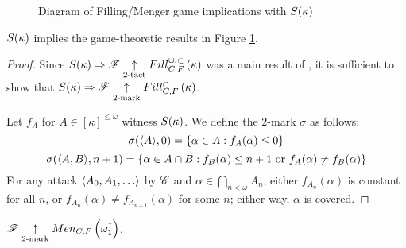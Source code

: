 \begin{figure}[h]
\begin{center}
\end{center}
\caption{Diagram of Filling/Menger game implications with $S(\kappa)$}
\label{fillingGamesDiagram2}
\end{figure}

\begin{thm}
  $S(\kappa)$ implies the game-theoretic results in
  Figure \ref{fillingGamesDiagram2}.
\end{thm}

\begin{proof}
  Since $S(\kappa)\Rightarrow\mathscr{F} \underset{2\text{-tact}}{\uparrow}Fill^{\cup,\subset}_{C,F}\left({\kappa}\right)$ was
  a main result of \cite{MR1129143}, it is sufficient to show that
  $S(\kappa)\Rightarrow \mathscr{F} \underset{2\text{-mark}}{\uparrow}Fill^{\cap}_{C,F}\left({\kappa}\right)$.

  Let $f_A$ for $A\in[\kappa]^{\leq\omega}$ witness $S(\kappa)$. We define
  the $2$-mark $\sigma$ as follows:
    \[
      \sigma(\langle A\rangle,0) = \{\alpha\in A: f_A(\alpha) \leq 0 \}
    \]
    \[
      \sigma(\langle A,B\rangle,n+1)
        =
      \{
        \alpha \in A\cap B
      :
        f_B(\alpha) \leq n+1 \text{ or }
        f_A(\alpha)\not=f_B(\alpha)
      \}
    \]
  For any attack $\<A_0,A_1,\dots\>$ by $\mathscr{C}$ and
  $\alpha\in\bigcap_{n<\omega}A_n$, either $f_{A_n}(\alpha)$ is constant for
  all $n$, or $f_{A_n}(\alpha)\not=f_{A_{n+1}}(\alpha)$ for some $n$;
  either way, $\alpha$ is covered.
\end{proof}

\begin{cor}
  $\mathscr{F} \underset{2\text{-mark}}{\uparrow}Men_{C,F}\left({\omega^\dagger_1}\right)$.
\end{cor}



